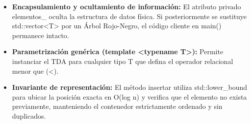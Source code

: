 \documentclass[11pt,letterpaper]{article}
\begin{document}
\begin{itemize}
\setlength{\itemsep}{2pt}\setlength{\parskip}{0pt}
  \item \textbf{Encapsulamiento y ocultamiento de información: }El atributo privado elementos\_ oculta la estructura de datos física. Si posteriormente se sustituye std::vector<T> por un Árbol Rojo-Negro, el código cliente en main() permanece intacto.
  \item \textbf{Parametrización genérica (template <typename T>): }Permite instanciar el TDA para cualquier tipo T que defina el operador relacional menor que (<).
  \item \textbf{Invariante de representación: }El método insertar utiliza std::lower\_bound para ubicar la posición exacta en O(log n) y verifica que el elemento no exista previamente, manteniendo el contenedor estrictamente ordenado y sin duplicados.
\end{itemize}
\end{document}

